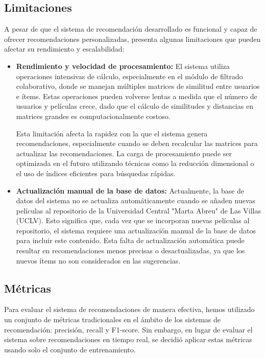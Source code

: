 \documentclass{llncs}
\begin{document}
	\subsection{Limitaciones}
	A pesar de que el sistema de recomendación desarrollado es funcional y capaz de ofrecer recomendaciones personalizadas, presenta algunas limitaciones que pueden afectar su rendimiento y escalabilidad:
	\begin{itemize}
		\item \textbf{Rendimiento y velocidad de procesamiento:}
		El sistema utiliza operaciones intensivas de cálculo, especialmente en el módulo de filtrado colaborativo, donde se manejan múltiples matrices de similitud entre usuarios e ítems. Estas operaciones pueden volverse lentas a medida que el número de usuarios y películas crece, dado que el cálculo de similitudes y distancias en matrices grandes es computacionalmente costoso.
		
		Esta limitación afecta la rapidez con la que el sistema genera recomendaciones, especialmente cuando se deben recalcular las matrices para actualizar las recomendaciones. La carga de procesamiento puede ser optimizada en el futuro utilizando técnicas como la reducción dimensional o el uso de índices eficientes para búsquedas rápidas.
		
		\item \textbf{Actualización manual de la base de datos:}
		Actualmente, la base de datos del sistema no se actualiza automáticamente cuando se añaden nuevas películas al repositorio de la Universidad Central "Marta Abreu" de Las Villas (UCLV). Esto significa que, cada vez que se incorporan nuevas películas al repositorio, el sistema requiere una actualización manual de la base de datos para incluir este contenido.
		Esta falta de actualización automática puede resultar en recomendaciones menos precisas o desactualizadas, ya que los nuevos ítems no son considerados en las sugerencias. 
	\end{itemize}
		\subsection{Métricas}
		
		Para evaluar el sistema de recomendaciones de manera efectiva, hemos utilizado un conjunto de métricas tradicionales en el ámbito de los sistemas de recomendación: precisión, recall y F1-score. Sin embargo, en lugar de evaluar el sistema sobre recomendaciones en tiempo real, se decidió aplicar estas métricas usando solo el conjunto de entrenamiento.
		
\end{document}
